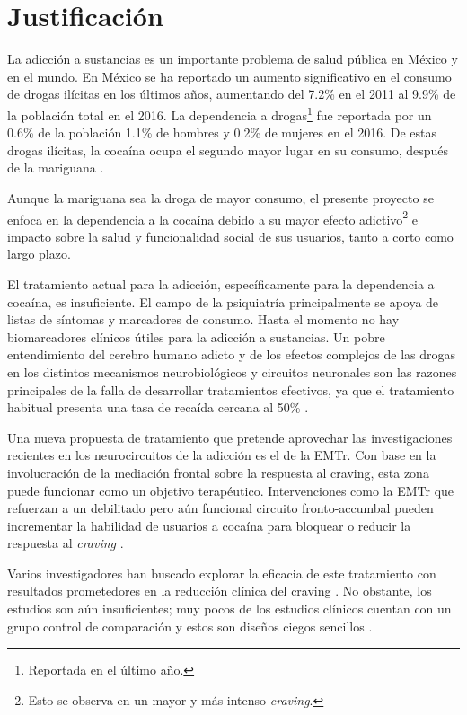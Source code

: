 \section{Justificación}
La adicción a sustancias es un importante problema de salud pública en México y en el mundo.
En México se ha reportado un aumento significativo en el consumo de drogas ilícitas en los últimos años, aumentando del 7.2\% en el 2011 al 9.9\% de la población total en el 2016.
La dependencia a drogas\footnote{Reportada en el último año.} fue reportada por un 0.6\% de la población \textemdash{}1.1\% de hombres y 0.2\% de mujeres en el 2016.
De estas drogas ilícitas, la cocaína ocupa el segundo mayor lugar en su consumo, después de la mariguana \parencite{Villatoro-Velazques2017}.\par
Aunque la mariguana sea la droga de mayor consumo, el presente proyecto se enfoca en la dependencia a la cocaína debido a su mayor efecto adictivo\footnote{Esto se observa en un mayor y más intenso \textit{craving}.} e impacto sobre la salud y funcionalidad social de sus usuarios, tanto a corto como largo plazo. \par
El tratamiento actual para la adicción, específicamente para la dependencia a cocaína, es insuficiente.
El campo de la psiquiatría principalmente se apoya de listas de síntomas y marcadores de consumo.
Hasta el momento no hay biomarcadores clínicos útiles para la adicción a sustancias.
Un pobre entendimiento del cerebro humano adicto y de los efectos complejos de las drogas en los distintos mecanismos neurobiológicos y circuitos neuronales son las razones principales de la falla de desarrollar tratamientos efectivos, ya que el tratamiento habitual presenta una tasa de recaída cercana al 50\% \parencite{McLellan2000a}. \par
Una nueva propuesta de tratamiento que pretende aprovechar las investigaciones recientes en los neurocircuitos de la adicción es el de la EMTr.
Con base en la involucración de la mediación frontal sobre la respuesta al craving, esta zona puede funcionar como un objetivo terapéutico. Intervenciones como la EMTr que refuerzan a un debilitado pero aún funcional circuito fronto-accumbal pueden incrementar la habilidad de usuarios a cocaína para bloquear o reducir la respuesta al \textit{craving} \parencite{Volkow2010a}. \par
Varios investigadores han buscado explorar la eficacia de este tratamiento con resultados prometedores en la reducción clínica del craving \parencite{Rachid2018}.
No obstante, los estudios son aún insuficientes; muy pocos de los estudios clínicos cuentan con un grupo control de comparación y estos son diseños ciegos sencillos \parencite{Kearney-Ramos2018a, Kearney-Ramos2019, Terraneo2016,Hanlon2015}.
